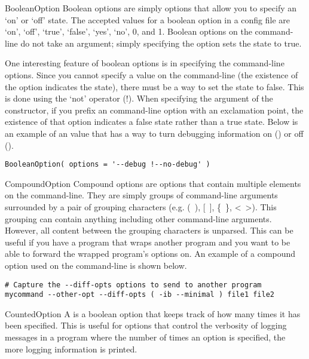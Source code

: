 \documentclass{manual}
\begin{document}
\begin{classdesc}{BooleanOption}{}
Boolean options are simply options that allow you to specify an `on' or 
`off' state.  The accepted values for a boolean option in a config file
are `on', `off', `true', `false', `yes', `no', 0, and 1.  Boolean options on
the command-line do not take an argument; simply specifying the option
sets the state to true.

One interesting feature of boolean options is in specifying the command-line
options.  Since you cannot specify a value on the command-line (the existence
of the option indicates the state), there must be a way to set the state to
false.  This is done using the `not' operator (!).  When specifying the 
 argument of the constructor, if you prefix an command-line 
option with an exclamation point, the existence of that option indicates
a false state rather than a true state.  Below is an example of an 
value that has a way to turn debugging information on () 
or off ().
\begin{verbatim}
BooleanOption( options = '--debug !--no-debug' )
\end{verbatim}
\end{classdesc}

\begin{classdesc}{CompoundOption}{}
Compound options are options that contain multiple elements on the 
command-line.  They are simply groups of command-line arguments surrounded
by a pair of grouping characters (e.g. (~), [~], \{~\}, <~>).  This grouping
can contain anything including other command-line arguments.  However, 
all content between the grouping characters is unparsed.  This can be useful
if you have a program that wraps another program and you want to be able
to forward the wrapped program's options on.  An example of a compound option
used on the command-line is shown below.
\begin{verbatim}
# Capture the --diff-opts options to send to another program
mycommand --other-opt --diff-opts ( -ib --minimal ) file1 file2
\end{verbatim}
\end{classdesc}

\begin{classdesc}{CountedOption}{}
A  is a boolean option that keeps track of how many
times it has been specified.  This is useful for options that control 
the verbosity of logging messages in a program where the number of times
an option is specified, the more logging information is printed.
\end{classdesc}
\end{document}
